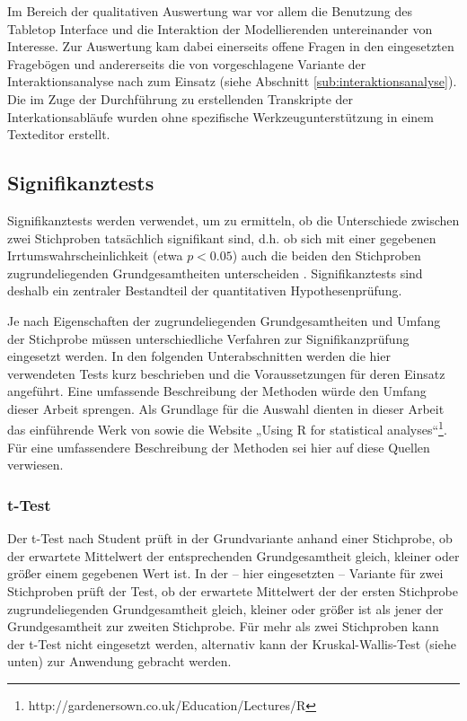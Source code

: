 Im Bereich der qualitativen Auswertung war vor allem die Benutzung des Tabletop Interface und die Interaktion der Modellierenden untereinander von Interesse. Zur Auswertung kam dabei einerseits offene Fragen in den eingesetzten Fragebögen und andererseits die von \citet{Hornecker04} vorgeschlagene Variante der Interaktionsanalyse nach \citet{Jordan95} zum Einsatz (siehe Abschnitt \ref{sub:interaktionsanalyse}). Die im Zuge der Durchführung zu erstellenden Transkripte der Interkationsabläufe wurden ohne spezifische Werkzeugunterstützung in einem Texteditor erstellt.

\subsection{Signifikanztests} %
\label{sub:signifikanztests}

Signifikanztests werden verwendet, um zu ermitteln, ob die Unterschiede zwischen zwei Stichproben tatsächlich signifikant sind, d.h. ob sich mit einer gegebenen Irrtumswahrscheinlichkeit (etwa $p<0.05$) auch die beiden den Stichproben zugrundeliegenden Grundgesamtheiten unterscheiden \citep[][S. 496]{Bortz03}. Signifikanztests sind deshalb ein zentraler Bestandteil der quantitativen Hypothesenprüfung.

Je nach Eigenschaften der zugrundeliegenden Grundgesamtheiten und Umfang der Stichprobe müssen unterschiedliche Verfahren zur Signifikanzprüfung eingesetzt werden. In den folgenden Unterabschnitten werden die hier verwendeten Tests kurz beschrieben und die Voraussetzungen für deren Einsatz angeführt. Eine umfassende Beschreibung der Methoden würde den Umfang dieser Arbeit sprengen. Als Grundlage für die Auswahl dienten in dieser Arbeit das einführende Werk von \citet{Bortz03} sowie die Website „Using R for statistical analyses“\footnote{http://gardenersown.co.uk/Education/Lectures/R}. Für eine umfassendere Beschreibung der Methoden sei hier auf diese Quellen verwiesen.

\subsubsection{t-Test} %
\label{ssub:t_test}

Der t-Test nach Student prüft in der Grundvariante anhand einer Stichprobe, ob der erwartete Mittelwert der entsprechenden Grundgesamtheit gleich, kleiner oder größer einem gegebenen Wert ist. In der -- hier eingesetzten -- Variante für zwei Stichproben prüft der Test, ob der erwartete Mittelwert der der ersten Stichprobe zugrundeliegenden Grundgesamtheit gleich, kleiner oder größer ist als jener der Grundgesamtheit zur zweiten Stichprobe. Für mehr als zwei Stichproben kann der t-Test nicht eingesetzt werden, alternativ kann der Kruskal-Wallis-Test (siehe unten) zur Anwendung gebracht werden.

